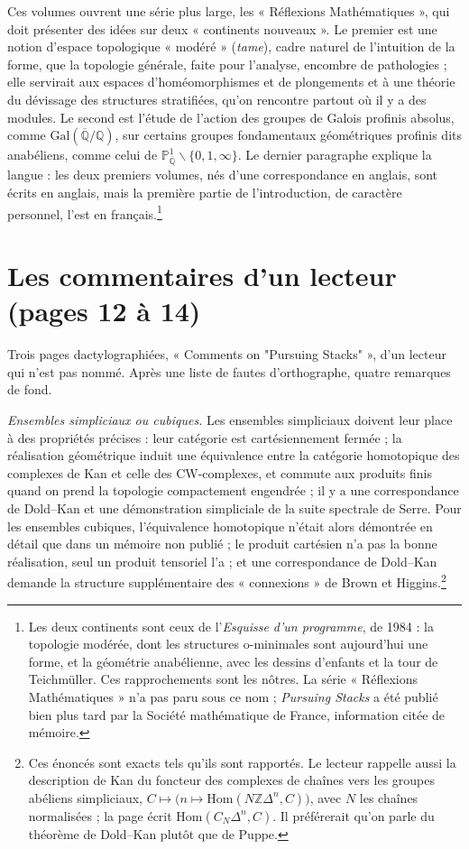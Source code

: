 \documentclass[11pt,a4paper]{article}
\begin{document}
Ces volumes ouvrent une série plus large, les « Réflexions Mathématiques »,
qui doit présenter des idées sur deux « continents nouveaux ». Le premier est
une notion d'espace topologique « modéré » (\emph{tame}), cadre naturel de
l'intuition de la forme, que la topologie générale, faite pour l'analyse,
encombre de pathologies ; elle servirait aux espaces d'homéomorphismes et de
plongements et à une théorie du dévissage des structures stratifiées, qu'on
rencontre partout où il y a des modules. Le second est l'étude de l'action
des groupes de Galois profinis absolus, comme
$\mathrm{Gal}(\overline{\mathbb{Q}}/\mathbb{Q})$, sur certains groupes
fondamentaux géométriques profinis dits anabéliens, comme celui de
$\mathbb{P}^{1}_{\overline{\mathbb{Q}}} \smallsetminus \{0, 1, \infty\}$.
Le dernier paragraphe explique la langue : les deux premiers volumes, nés
d'une correspondance en anglais, sont écrits en anglais, mais la première
partie de l'introduction, de caractère personnel, l'est en
français.\footnote{Les deux continents sont ceux de l'\emph{Esquisse d'un
programme}, de 1984 : la topologie modérée, dont les structures o-minimales
sont aujourd'hui une forme, et la géométrie anabélienne, avec les dessins
d'enfants et la tour de Teichmüller. Ces rapprochements sont les
nôtres. La série « Réflexions Mathématiques » n'a pas paru sous ce nom ;
\emph{Pursuing Stacks} a été publié bien plus tard par la Société
mathématique de France, information citée de mémoire.}

\section*{Les commentaires d'un lecteur (pages 12 à 14)}

Trois pages dactylographiées, « Comments on "Pursuing Stacks" », d'un lecteur
qui n'est pas nommé. Après une liste de fautes d'orthographe, quatre remarques
de fond.

\emph{Ensembles simpliciaux ou cubiques.} Les ensembles simpliciaux doivent
leur place à des propriétés précises : leur catégorie est cartésiennement
fermée ; la réalisation géométrique induit une équivalence entre la catégorie
homotopique des complexes de Kan et celle des CW-complexes, et commute aux
produits finis quand on prend la topologie compactement engendrée ; il y a
une correspondance de Dold--Kan et une démonstration simpliciale de la suite
spectrale de Serre. Pour les ensembles cubiques, l'équivalence homotopique
n'était alors démontrée en détail que dans un mémoire non publié ; le produit
cartésien n'a pas la bonne réalisation, seul un produit tensoriel l'a ; et une
correspondance de Dold--Kan demande la structure supplémentaire des
« connexions » de Brown et Higgins.\footnote{Ces énoncés sont exacts tels
qu'ils sont rapportés. Le lecteur rappelle aussi la description de Kan du
foncteur des complexes de chaînes vers les groupes abéliens simpliciaux,
$C \mapsto \bigl(n \mapsto \mathrm{Hom}(N\mathbb{Z}\Delta^{n}, C)\bigr)$,
avec $N$ les chaînes normalisées ; la page écrit $\mathrm{Hom}(C_{N}\Delta^{n},
C)$. Il préférerait qu'on parle du théorème de Dold--Kan plutôt que de Puppe.}
\end{document}
